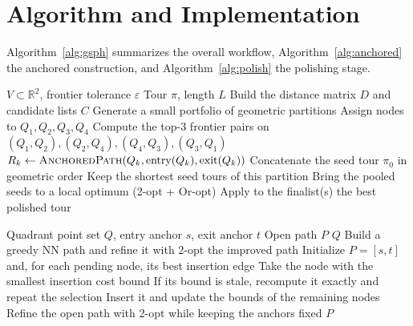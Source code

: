 \documentclass[runningheads]{llncs}
\begin{document}
\section{Algorithm and Implementation}
\label{sec:algorithm}

Algorithm~\ref{alg:gsph} summarizes the overall workflow,
Algorithm~\ref{alg:anchored} the anchored construction, and
Algorithm~\ref{alg:polish} the polishing stage.

\begin{algorithm}
\caption{GSPH-FC --- top-level procedure}
\label{alg:gsph}
\begin{algorithmic}[1]
\Require $V\subset\mathbb{R}^2$, frontier tolerance $\varepsilon$
\Ensure Tour $\pi$, length $L$
\State Build the distance matrix $D$ and candidate lists $C$
\State Generate a small portfolio of geometric partitions
  \State Assign nodes to $Q_1,Q_2,Q_3,Q_4$
  \State Compute the top-3 frontier pairs on
         $(Q_1,Q_2),(Q_2,Q_4),(Q_4,Q_3),(Q_3,Q_1)$
      \State $R_k\gets\Call{AnchoredPath}{Q_k,\text{entry}(Q_k),\text{exit}(Q_k)}$
    \EndFor
    \State Concatenate the seed tour $\pi_0$ in geometric order
  \EndFor
  \State Keep the shortest seed tours of this partition
\EndFor
\State Bring the pooled seeds to a local optimum (2-opt + Or-opt)
\State Apply  to the finalist(s)
\State \Return the best polished tour
\end{algorithmic}
\end{algorithm}

\begin{algorithm}
\caption{\textsc{AnchoredPath} --- anchored intra-quadrant construction}
\label{alg:anchored}
\begin{algorithmic}[1]
\Require Quadrant point set $Q$, entry anchor $s$, exit anchor $t$
\Ensure Open path $P$
  \State \Return $Q$
\EndIf
{}
  \State Build a greedy NN path and refine it with 2-opt
  \State \Return the improved path
\EndIf
\State Initialize $P=[s,t]$ and, for each pending node, its best insertion edge
  \State Take the node with the smallest insertion cost bound
  \State If its bound is stale, recompute it exactly and repeat the selection
  \State Insert it and update the bounds of the remaining nodes
\EndWhile
\State Refine the open path with 2-opt while keeping the anchors fixed
\State \Return $P$
\end{algorithmic}
\end{algorithm}
\end{document}
